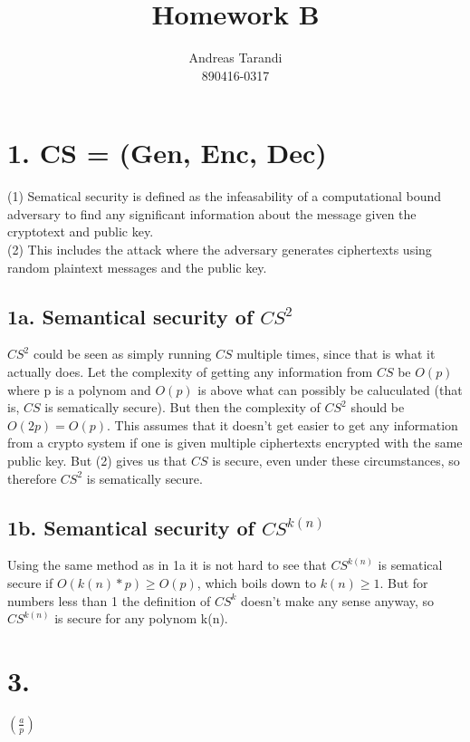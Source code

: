 \documentclass[a4paper,11pt]{article}
\author{Andreas Tarandi\\890416-0317}
\title{Homework B}
\def\leg[#1]#2{\left(\frac{#1}{#2}\right) }
\begin{document}
	\maketitle

	\section*{1. CS = (Gen, Enc, Dec)}
		(1) Sematical security is defined as the infeasability of a computational bound adversary to find any significant information about the message given the cryptotext and public key. \\
		(2) This includes the attack where the adversary generates ciphertexts using random plaintext messages and the public key.
	
	\subsection*{1a. Semantical security of $CS^2$}
		$CS^2$ could be seen as simply running $CS$ multiple times, since that is what it actually does. 
		Let the complexity of getting any information from $CS$ be $O(p)$ where p is a polynom and $O(p)$ is above what can possibly be caluculated (that is, $CS$ is sematically secure). 
		But then the complexity of $CS^2$ should be $O(2p) = O(p)$. This assumes that it doesn't get easier to get any information from a crypto system if one is given multiple ciphertexts encrypted with the same public key.
		But (2) gives us that $CS$ is secure, even under these circumstances, so therefore $CS^2$ is sematically secure.

	\subsection*{1b. Semantical security of $CS^{k(n)}$}
		Using the same method as in 1a it is not hard to see that $CS^{k(n)}$ is sematical 
		secure if $O(k(n)*p) \ge O(p)$, which boils down to $k(n) \ge 1$. 
		But for numbers less than 1 the definition of $CS^k$ doesn't make any sense anyway, so $CS^{k(n)}$ is secure for any polynom k(n).


	\section*{3.}
	$\leg[a]{p}$
\end{document}
